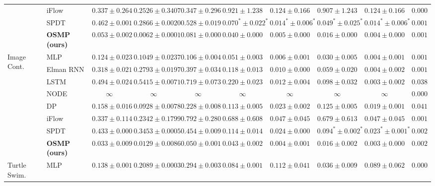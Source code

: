 \begin{table}[htbp]
\begin{tiny}
\begin{tabular}{|l|l|ccc|cc|cc|c|}
    & iFlow & $0.337 \pm 0.264$ & $0.2526 \pm 0.3407$ & $0.347 \pm 0.296$ & $0.921 \pm 1.238$ & $0.124 \pm 0.166$ & $0.907 \pm 1.243$ & $0.124 \pm 0.166$ & $\mathbf{0.0007}$\\
    & \gls{SPDT} & $0.462 \pm 0.001$ & $0.2866 \pm 0.0020$ & $0.528 \pm 0.019$ & $0.070^* \pm 0.022^*$ & $0.014^* \pm 0.006^*$ & $0.049^* \pm 0.025^*$ & $0.014^* \pm 0.006^*$ & $0.0017$\\
    & \textbf{OSMP (ours)} & $0.053 \pm 0.002$ & $0.0062 \pm 0.0001$ & $0.081 \pm 0.000$ & $\mathbf{0.040 \pm 0.000}$ & $\mathbf{0.005 \pm 0.000}$ & $\mathbf{0.016 \pm 0.000}$ & $\mathbf{0.004 \pm 0.000}$ & $0.0019$\\
    \midrule
    \multirow{8}{*}{Image Cont.} & MLP & $0.124 \pm 0.023$ & $0.1049 \pm 0.0237$ & $0.106 \pm 0.004$ & $0.051 \pm 0.003$ & $0.006 \pm 0.001$ & $0.030 \pm 0.005$ & $0.004 \pm 0.001$ & $0.0012$\\
    & Elman \gls{RNN} & $0.318 \pm 0.021$ & $0.2793 \pm 0.0197$ & $0.397 \pm 0.034$ & $0.118 \pm 0.013$ & $0.010 \pm 0.000$ & $0.059 \pm 0.020$ & $0.004 \pm 0.002$ & $0.0012$\\
    & \gls{LSTM} & $0.494 \pm 0.024$ & $0.5415 \pm 0.0071$ & $0.719 \pm 0.073$ & $0.220 \pm 0.023$ & $0.012 \pm 0.004$ & $0.098 \pm 0.032$ & $0.003 \pm 0.002$ & $0.0385$\\
    & \gls{NODE} & $\infty$ & $\infty$ & $\infty$ & $\infty$ & $\infty$ & $\infty$ & $\infty$ & $\mathbf{0.0009}$\\
    & \gls{DP} & $0.158 \pm 0.016$ & $0.0928 \pm 0.0078$ & $0.228 \pm 0.008$ & $0.113 \pm 0.005$ & $0.023 \pm 0.002$ & $0.125 \pm 0.005$ & $0.019 \pm 0.001$ & $0.0410$\\
    & iFlow & $0.337 \pm 0.114$ & $0.2342 \pm 0.1799$ & $0.792 \pm 0.280$ & $0.688 \pm 0.608$ & $0.047 \pm 0.045$ & $0.679 \pm 0.613$ & $0.047 \pm 0.045$ & $0.0014$\\
    & \gls{SPDT} & $0.433 \pm 0.000$ & $0.3453 \pm 0.0005$ & $0.454 \pm 0.009$ & $0.114 \pm 0.014$ & $0.024 \pm 0.000$ & $0.094^* \pm 0.002^*$ & $0.023^* \pm 0.001^*$ & $0.0027$\\
    & \textbf{OSMP (ours)} & $\mathbf{0.033 \pm 0.009}$ & $\mathbf{0.0129 \pm 0.0086}$ & $\mathbf{0.050 \pm 0.001}$ & $\mathbf{0.043 \pm 0.002}$ & $\mathbf{0.004 \pm 0.001}$ & $\mathbf{0.016 \pm 0.002}$ & $\mathbf{0.003 \pm 0.000}$ & $0.0028$\\
    \midrule
    \multirow{8}{*}{Turtle Swim.} & MLP & $0.138 \pm 0.001$ & $0.2089 \pm 0.0003$ & $0.294 \pm 0.003$ & $\mathbf{0.084 \pm 0.001}$ & $\mathbf{0.112 \pm 0.041}$ & $\mathbf{0.036 \pm 0.009}$ & $\mathbf{0.089 \pm 0.062}$ & $0.0008$\\

\end{tabular}
\end{tiny}
\end{table}
